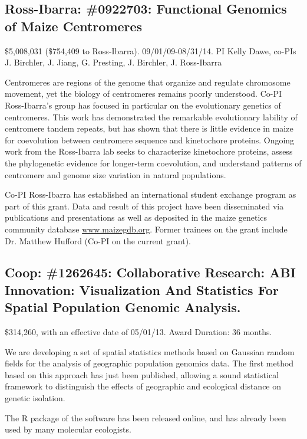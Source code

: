 \subsection*{Ross-Ibarra: \#0922703: Functional Genomics of Maize Centromeres}
\$5,008,031 (\$754,409 to Ross-Ibarra). 09/01/09-08/31/14. PI Kelly Dawe, co-PIs J. Birchler, J. Jiang, G. Presting, J. Birchler, J. Ross-Ibarra
\par{} Centromeres are regions of the genome that organize and regulate chromosome movement, yet the biology of centromeres remains poorly understood. Co-PI Ross-Ibarra's group has focused in particular on the evolutionary genetics of centromeres. This work has demonstrated the remarkable evolutionary lability of centromere tandem repeats, but has shown that there is little evidence in maize for coevolution between centromere sequence and kinetochore proteins. Ongoing work from the Ross-Ibarra lab seeks to characterize kinetochore proteins, assess the phylogenetic evidence for longer-term coevolution, and understand patterns of centromere and genome size variation in natural populations.
\par{}  Co-PI Ross-Ibarra has established an international student exchange program as part of this grant. Data and result of this project have been disseminated via publications and presentations as well as deposited in the maize genetics community database \url{www.maizegdb.org}. Former trainees on the grant include Dr. Matthew Hufford (Co-PI on the current grant). 
\par{} \citet{Shi2010a, Chia2012a, Fang2012a, Hufford2012, Hufford2012b, Hufford2013, Melters2013a, Kanizay2013, Pyhajarvi2013}

\subsection*{Coop: \#1262645: Collaborative Research: ABI Innovation: Visualization And Statistics For Spatial Population Genomic Analysis. }
\$314,260, with an effective date of 05/01/13. Award Duration: 36 months.
\par{} We are developing a set of spatial statistics methods based on Gaussian random fields for the analysis of geographic population genomics data. The first method based on this approach has just been published, allowing a sound statistical framework to distinguish the effects of geographic and ecological distance on genetic isolation. 
\par{}  The R package of the software has been released online, and has already been used by many molecular ecologists. 
\par{} \citet{bradburd2013}

